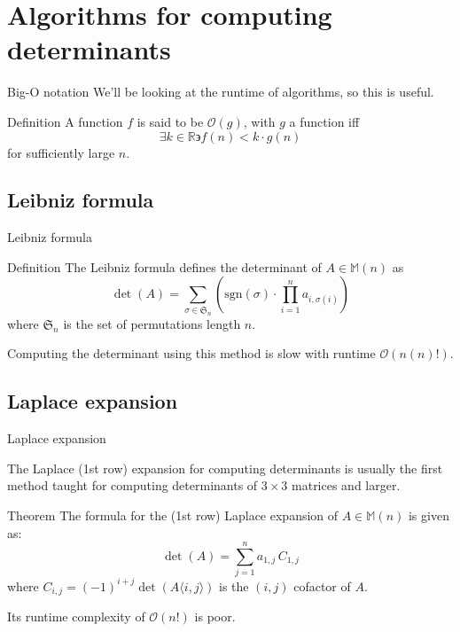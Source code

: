 \documentclass{beamer}
\begin{document}
\section{Algorithms for computing determinants}

\begin{frame}{Big-O notation}
    We'll be looking at the runtime of algorithms, so this is useful.

    \begin{block}{Definition}
        A function $f$ is said to be $\mathcal{O}(g)$, with $g$ a function iff
        \[
            \exists k \in \mathbb{R} \backepsilon f(n) < k \cdot g(n)
        \]
        for sufficiently large $n$.
    \end{block}
    
\end{frame}

\subsection{Leibniz formula}

\begin{frame}{Leibniz formula}

    \begin{block}{Definition}
        The Leibniz formula defines the determinant of $A \in \mathbb{M}(n)$ as
        \[
            \det(A) = \sum_{\sigma \in \mathfrak{S}_n}
            \left( \text{sgn}(\sigma) \cdot \prod_{i=1}^n a_{i,\sigma(i)} \right)
        \]
        where $\mathfrak{S}_n$ is the set of permutations length $n$.
    \end{block}

    \pause{}

    Computing the determinant using this method is slow with runtime $\mathcal{O}(n(n)!)$.

\end{frame}

\subsection{Laplace expansion}

\begin{frame}{Laplace expansion}

    The Laplace (1st row) expansion for computing determinants is usually the first method taught
    for computing determinants of $3 \times 3$ matrices and larger.

    \pause{}

    \begin{block}{Theorem}
        The formula for the (1st row) Laplace expansion of $A \in \mathbb{M}(n)$
        is given as:
        \[
            \det(A) = \sum_{j=1}^n a_{1,j}\, C_{1,j}
        \]
        where $C_{i,j} = {(-1)}^{i+j} \det{(A \langle i, j \rangle)}$ is the
        $(i, j)$ cofactor of $A$.
    \end{block}

    \pause{}

    Its runtime complexity of $\mathcal{O}(n!)$ is poor.

\end{frame}
\end{document}
